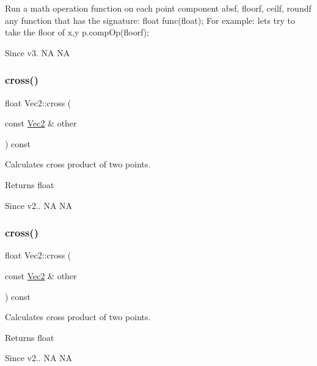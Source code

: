 Run a math operation function on each point component absf, floorf, ceilf, roundf any function that has the signature\+: float func(float); For example\+: let\textquotesingle{}s try to take the floor of x,y p.\+comp\+Op(floorf); \begin{DoxySince}{Since}
v3.  NA  NA 
\end{DoxySince}
\mbox{\label{classVec2_a4ff58f0ee9e2c3e7432407f256fade58}} 
\subsubsection{\texorpdfstring{cross()}{cross()}\hspace{0.1cm}{\footnotesize\ttfamily [1/2]}}
{\footnotesize\ttfamily float Vec2\+::cross (\begin{DoxyParamCaption}\item[{const \hyperlink{classVec2}{Vec2} \&}]{other }\end{DoxyParamCaption}) const\hspace{0.3cm}{\ttfamily [inline]}}

Calculates cross product of two points. \begin{DoxyReturn}{Returns}
float 
\end{DoxyReturn}
\begin{DoxySince}{Since}
v2..  NA  NA 
\end{DoxySince}
\mbox{\label{classVec2_a4ff58f0ee9e2c3e7432407f256fade58}} 
\subsubsection{\texorpdfstring{cross()}{cross()}\hspace{0.1cm}{\footnotesize\ttfamily [2/2]}}
{\footnotesize\ttfamily float Vec2\+::cross (\begin{DoxyParamCaption}\item[{const \hyperlink{classVec2}{Vec2} \&}]{other }\end{DoxyParamCaption}) const\hspace{0.3cm}{\ttfamily [inline]}}

Calculates cross product of two points. \begin{DoxyReturn}{Returns}
float 
\end{DoxyReturn}
\begin{DoxySince}{Since}
v2..  NA  NA 
\end{DoxySince}
\mbox{\label{classVec2_a95cf4ec6593042a5c19186828f53d146}} 
